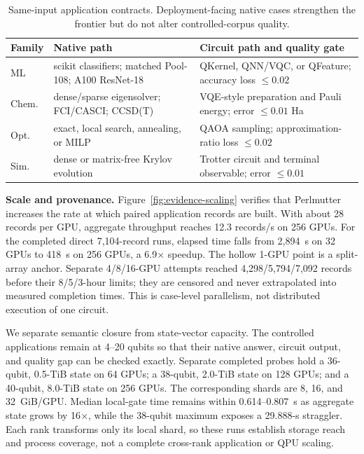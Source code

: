 \begin{table}[t]
\caption{Same-input application contracts. Deployment-facing native cases strengthen the frontier but do not alter controlled-corpus quality.}
\centering
\footnotesize
\setlength{\tabcolsep}{2.6pt}
\renewcommand{\arraystretch}{1.08}
\begin{tabular}{p{}p{}p{}}
\toprule
\textbf{Family} & \textbf{Native path} & \textbf{Circuit path and quality gate} \\
\midrule
ML & scikit classifiers; matched Pool-108; A100 ResNet-18 & QKernel, QNN/VQC, or QFeature; accuracy loss $\leq0.02$ \\
Chem. & dense/sparse eigensolver; FCI/CASCI; CCSD(T) & VQE-style preparation and Pauli energy; error $\leq0.01$ Ha \\
Opt. & exact, local search, annealing, or MILP & QAOA sampling; approximation-ratio loss $\leq0.02$ \\
Sim. & dense or matrix-free Krylov evolution & Trotter circuit and terminal observable; error $\leq0.01$ \\
\bottomrule
\end{tabular}
\label{tab:evaluation-setup}
\end{table}

\noindent\textbf{Scale and provenance.}
Figure~\ref{fig:evidence-scaling} verifies that Perlmutter increases the rate at which paired application records are built. With about 28 records per GPU, aggregate throughput reaches 12.3 records/s on 256 GPUs. For the completed direct 7,104-record runs, elapsed time falls from 2,894~s on 32 GPUs to 418~s on 256 GPUs, a 6.9$\times$ speedup. The hollow 1-GPU point is a split-array anchor. Separate 4/8/16-GPU attempts reached 4,298/5,794/7,092 records before their 8/5/3-hour limits; they are censored and never extrapolated into measured completion times. This is case-level parallelism, not distributed execution of one circuit.

We separate semantic closure from state-vector capacity. The controlled applications remain at 4--20 qubits so that their native answer, circuit output, and quality gap can be checked exactly. Separate completed probes hold a 36-qubit, 0.5-TiB state on 64 GPUs; a 38-qubit, 2.0-TiB state on 128 GPUs; and a 40-qubit, 8.0-TiB state on 256 GPUs. The corresponding shards are 8, 16, and 32~GiB/GPU. Median local-gate time remains within 0.614--0.807~s as aggregate state grows by 16$\times$, while the 38-qubit maximum exposes a 29.888-s straggler. Each rank transforms only its local shard, so these runs establish storage reach and process coverage, not a complete cross-rank application or QPU scaling.

